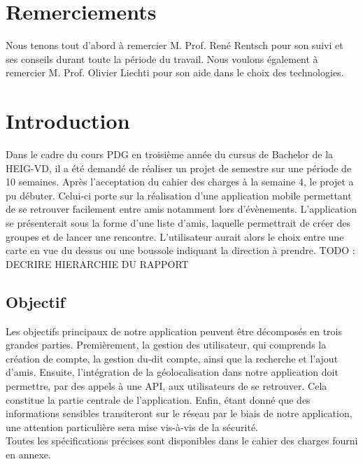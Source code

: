 \documentclass[french]{article}
\begin{document}
	\newpage
	
	\section*{Remerciements}
	Nous tenons tout d'abord à remercier M. Prof. René Rentsch pour son suivi et ses conseils durant toute la période du travail. Nous voulons également à remercier M. Prof. Olivier Liechti pour son aide dans le choix des technologies.
	
	\section{Introduction}
	Dans le cadre du cours PDG en troisième année du cursus de Bachelor de la HEIG-VD, il a été demandé de réaliser un projet de semestre sur une période de 10 semaines. Après l'acceptation du cahier des charges à la semaine 4, le projet a pu débuter. Celui-ci porte sur la réalisation d'une application mobile permettant de se retrouver facilement entre amis notamment lors d'évènements. L’application se présenterait sous la forme d’une liste d’amis, laquelle permettrait de créer des groupes et de lancer une rencontre. L’utilisateur aurait alors le choix entre une carte en vue du dessus ou une boussole indiquant la direction à prendre.
	TODO : DECRIRE HIERARCHIE DU RAPPORT
	
		\subsection{Objectif}
		Les objectifs principaux de notre application peuvent être décomposés en trois grandes parties. Premièrement, la gestion des utilisateur, qui comprends la création de compte, la gestion du-dit compte, ainsi que la recherche et l'ajout d'amis. Ensuite, l'intégration de la géolocalisation dans notre application doit permettre, par des appels à une API, aux utilisateurs de se retrouver. Cela constitue la partie centrale de l'application. Enfin, étant donné que des informations sensibles transiteront sur le réseau par le biais de notre application, une attention particulière sera mise vis-à-vis de la sécurité.\\
		Toutes les spécifications précises sont disponibles dans le cahier des charges fourni en annexe.
		
\end{document}
